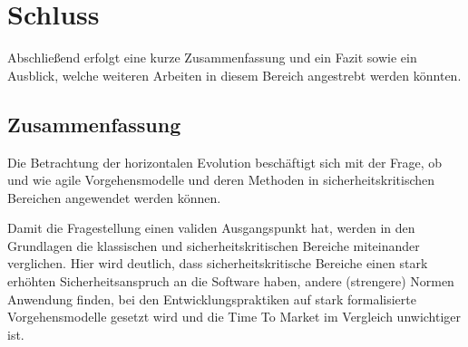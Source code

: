 \chapter{Schluss} %

Abschließend erfolgt eine kurze Zusammenfassung und ein Fazit sowie ein Ausblick, welche weiteren Arbeiten in diesem Bereich angestrebt werden könnten.

\section{Zusammenfassung}

\begin{comment}
++++++++++++
Im Schlussteil sollte man daher die in der Einleitung formulierten Leitfragen noch einmal aufgreifen und auf deren Beantwortung im Hauptteil der Hausarbeit eingehen: Wurden alle Leitfragen aus der Einleitung beantwortet?
Gleichzeitig bietet die Beantwortung der Leitfragen auch eine Möglichkeit, die Ergebnisse der Hausarbeit "auf den Punkt" bringen und eine Zusammenfassung zu formulieren.

FRAGEN AUS EINLEITUNG:
"Die vorliegende Arbeit soll untersuchen, wie und unter welchen Voraussetzungen sich DevOps einführen lässt und ob DevOps auch in sicherheitskritischen Bereichen Anwendung finden kann.
Außerdem soll geklärt werden, wie sich die Anwendung von agilen Vorgehensmodellen und deren Methoden auf sicherheitskritische Bereiche erweitern lässt.
Insbesondere soll untersucht werden, worin sich die klassischen und sicherheitskritischen Bereiche unterscheiden und welche Voraussetzungen geschaffen werden müssen, damit agile Methoden und DevOps eingeführt werden können.
Durch Betrachtung von Fallstudien, die die Einführung von DevOps und agilen Vorgehensmodellen in sicherheitskritischen Bereichen untersuchen, soll erarbeitet werden, welche Anpassungen an den Konzepten notwendig sind, um in diesen Bereichen sinnvoll eingesetzt werden zu können.

=> das beantworten..
++++++++++++
\end{comment}



Die Betrachtung der horizontalen Evolution beschäftigt sich mit der Frage, ob und wie agile Vorgehensmodelle und deren Methoden in sicherheitskritischen Bereichen angewendet werden können.

Damit die Fragestellung einen validen Ausgangspunkt hat, werden in den Grundlagen die klassischen und sicherheitskritischen Bereiche miteinander verglichen.
Hier wird deutlich, dass sicherheitskritische Bereiche einen stark erhöhten Sicherheitsanspruch an die Software haben, andere (strengere) Normen Anwendung finden, bei den Entwicklungspraktiken auf stark formalisierte Vorgehensmodelle gesetzt wird und die Time To Market im Vergleich unwichtiger ist.

